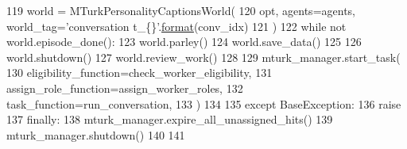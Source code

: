 \begin{DoxyCode}
119             world = MTurkPersonalityCaptionsWorld(
120                 opt, agents=agents, world\_tag=\textcolor{stringliteral}{'conversation t\_\{\}'}.\hyperlink{namespaceparlai_1_1chat__service_1_1services_1_1messenger_1_1shared__utils_a32e2e2022b824fbaf80c747160b52a76}{format}(conv\_idx)
121             )
122             \textcolor{keywordflow}{while} \textcolor{keywordflow}{not} world.episode\_done():
123                 world.parley()
124             world.save\_data()
125 
126             world.shutdown()
127             world.review\_work()
128 
129         mturk\_manager.start\_task(
130             eligibility\_function=check\_worker\_eligibility,
131             assign\_role\_function=assign\_worker\_roles,
132             task\_function=run\_conversation,
133         )
134 
135     \textcolor{keywordflow}{except} BaseException:
136         \textcolor{keywordflow}{raise}
137     \textcolor{keywordflow}{finally}:
138         mturk\_manager.expire\_all\_unassigned\_hits()
139         mturk\_manager.shutdown()
140 
141 
\end{DoxyCode}
